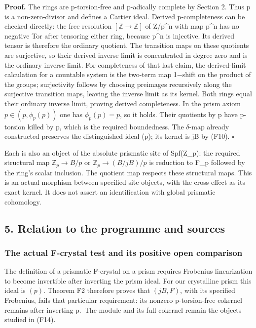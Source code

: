 \documentclass[
]{article}
\begin{document}
\textbf{Proof.} The rings are p-torsion-free and p-adically complete by
Section 2. Thus p is a non-zero-divisor and defines a Cartier ideal.
Derived p-completeness can be checked directly: the free resolution
\([\mathbb Z\to\mathbb Z]\) of Z/p\^{}n with map p\^{}n has no negative
Tor after tensoring either ring, because p\^{}n is injective. Its
derived tensor is therefore the ordinary quotient. The transition maps
on these quotients are surjective, so their derived inverse limit is
concentrated in degree zero and is the ordinary inverse limit. For
completeness of that last claim, the derived-limit calculation for a
countable system is the two-term map 1−shift on the product of the
groups; surjectivity follows by choosing preimages recursively along the
surjective transition maps, leaving the inverse limit as its kernel.
Both rings equal their ordinary inverse limit, proving derived
completeness. In the prism axiom \(p\in(p,\phi_p(p))\) one has
\(\phi_p(p)=p\), so it holds. Their quotients by p have p-torsion killed
by p, which is the required boundedness. The \(\delta\)-map already
constructed preserves the distinguished ideal (p); its kernel is jB by
(F10). \(\square\)

Each is also an object of the absolute prismatic site of Spf(Z\_p): the
required structural map \(\mathbb Z_p\to B/p\) or
\(\mathbb Z_p\to(B/jB)/p\) is reduction to F\_p followed by the ring's
scalar inclusion. The quotient map respects these structural maps. This
is an actual morphism between specified site objects, with the
cross-effect as its exact kernel. It does not assert an identification
with global prismatic cohomology.

\subsection{5. Relation to the programme and
sources}\label{relation-to-the-programme-and-sources}

\subsubsection{The actual F-crystal test and its positive open
comparison}\label{the-actual-f-crystal-test-and-its-positive-open-comparison}

The definition of a prismatic F-crystal on a prism requires Frobenius
linearization to become invertible after inverting the prism ideal. For
our crystalline prism this ideal is \((p)\). Theorem F2 therefore proves
that \((jB,F)\), with its specified Frobenius, fails that particular
requirement: its nonzero p-torsion-free cokernel remains after inverting
p.~The module and its full cokernel remain the objects studied in (F14).
\end{document}
